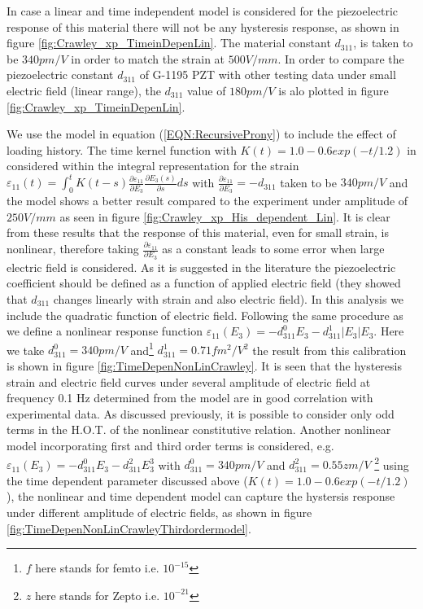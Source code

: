 In case a linear and time independent model is considered for the piezoelectric response of this material there will not be any hysteresis response, as shown in figure \ref{fig:Crawley_xp_TimeinDepenLin}. 
The material constant $d_{311}$, is taken to be $340 pm/V$ in order to match the strain at $500 V/mm$. 
In order to compare the piezoelectric constant $d_{311}$ of G-1195 PZT with other testing data under small electric field (linear range), the $d_{311}$ value of $180 pm/V$ \cite{low1995modeling} is alo plotted in figure \ref{fig:Crawley_xp_TimeinDepenLin}.

 
We use the model in equation (\ref{EQN:RecursiveProny}) \cite{tscharnuter2012nonlinear} to include the effect of loading history. 
The time kernel function with $K(t)=1.0-0.6 exp(-t/1.2)$ in considered within the integral representation for the strain $\varepsilon_{11}(t)=\int_0^t
K(t-s)\frac{\partial \varepsilon_{11}}{\partial E_3}\frac{\partial
E_3(s)}{\partial s} ds$ with $\frac{\partial \varepsilon_{11}}{\partial
E_3}=-d_{311}$ taken to be $340 pm/V$ and the model shows a better result compared to the experiment under amplitude of $250V/mm$ as seen in figure \ref{fig:Crawley_xp_His_dependent_Lin}. 
It is clear from these results that the response of this material, even for small strain, is nonlinear, therefore taking $\frac{\partial\varepsilon_{11}}{\partial E_3}$ as a constant leads to some error when large electric field is considered.
As it is suggested in the literature \cite{anderson1989piezoceramic,Crawley1990} the piezoelectric coefficient should be defined as a function of applied electric field (they showed that $d_{311}$ changes linearly with strain and also electric field).
In this analysis we include the quadratic function of electric field. 
Following the same procedure as \cite{tscharnuter2012nonlinear} we define a nonlinear response function $\varepsilon_{11}(E_3)=-d_{311}^0 E_3-d_{311}^1 |E_3| E_3$.
Here we take $d_{311}^0=340pm/V$ and\footnote{$f$ here stands for femto i.e. $10^{-15}$ } $d_{311}^1=0.71 fm^2/V^2 $ the result from this calibration is shown in figure \ref{fig:TimeDepenNonLinCrawley}. It is seen that the hysteresis strain and electric field curves under several amplitude of electric field at frequency 0.1 Hz determined from the model are in good correlation with experimental data.
As discussed previously, it is possible to consider only odd terms in the H.O.T. of the nonlinear constitutive relation.
Another nonlinear model incorporating first and third order terms is considered, e.g. $\varepsilon_{11}(E_3)=-d_{311}^0 E_3-d_{311}^2 E_3^3$ with $d_{311}^0=340pm/V$ and $d_{311}^2=0.55 z m/V$ \footnote{$z$ here stands for Zepto i.e. $10^{-21}$ } using the time dependent parameter discussed above ($K(t)=1.0-0.6 exp(-t/1.2)$), 
the nonlinear and time dependent model can capture the hystersis response under different amplitude of electric fields, as shown in figure \ref{fig:TimeDepenNonLinCrawleyThirdordermodel}. 


